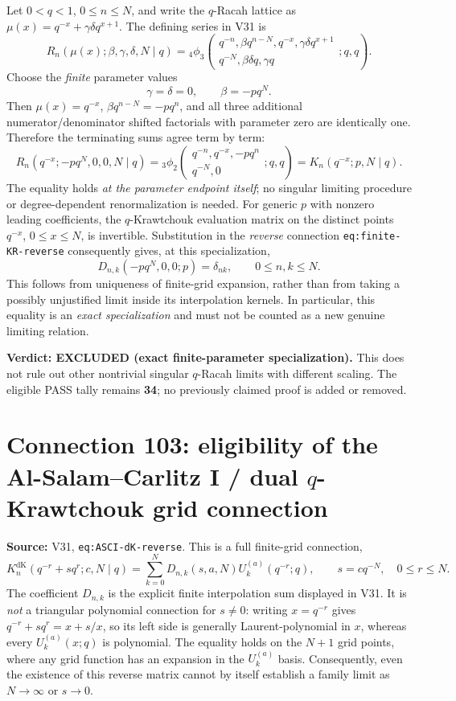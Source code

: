 \documentclass[11pt]{article}
\begin{document}
Let $0<q<1$, $0\le n\le N$, and write the $q$-Racah lattice as
$\mu(x)=q^{-x}+\gamma\delta q^{x+1}$. The defining series in V31 is
\[
R_n(\mu(x);\beta,\gamma,\delta,N\mid q)
={}_4\phi_3\!\left(\begin{matrix}
q^{-n},\beta q^{n-N},q^{-x},\gamma\delta q^{x+1}\\
q^{-N},\beta\delta q,\gamma q
\end{matrix};q,q\right).
\]
Choose the \emph{finite} parameter values
\[
\gamma=\delta=0,\qquad \beta=-pq^N.
\]
Then $\mu(x)=q^{-x}$, $\beta q^{n-N}=-pq^n$, and
all three additional numerator/denominator shifted factorials with
parameter zero are identically one. Therefore the terminating sums
agree term by term:
\[
\boxed{R_n(q^{-x};-pq^N,0,0,N\mid q)
={}_3\phi_2\!\left(\begin{matrix}
q^{-n},q^{-x},-pq^n\\q^{-N},0
\end{matrix};q,q\right)
=K_n(q^{-x};p,N\mid q).}
\]
The equality holds \emph{at the parameter endpoint itself}; no
singular limiting procedure or degree-dependent renormalization is
needed. For generic $p$ with nonzero leading coefficients, the
$q$-Krawtchouk evaluation matrix on the distinct points
$q^{-x}$, $0\le x\le N$, is invertible. Substitution in the
\emph{reverse} connection \texttt{eq:finite-KR-reverse} consequently
gives, at this specialization,
\[
D_{n,k}(-pq^N,0,0;p)=\delta_{nk},\qquad 0\le n,k\le N.
\]
This follows from uniqueness of finite-grid expansion, rather than
from taking a possibly unjustified limit inside its interpolation
kernels. In particular, this equality is an \emph{exact specialization}
and must not be counted as a new genuine limiting relation.

\noindent\textbf{Verdict: EXCLUDED (exact finite-parameter
specialization).} This does not rule out other nontrivial singular
$q$-Racah limits with different scaling. The eligible PASS tally
remains \textbf{34}; no previously claimed proof is added or removed.


\section{Connection 103: eligibility of the Al-Salam--Carlitz I / dual $q$-Krawtchouk grid connection}
\noindent\textbf{Source:} V31, \texttt{eq:ASCI-dK-reverse}. This is a full finite-grid connection,
\[
K_n^{\mathrm{dK}}(q^{-r}+sq^r;c,N\mid q)
=\sum_{k=0}^{N}D_{n,k}(s,a,N)U_k^{(a)}(q^{-r};q),
\qquad s=cq^{-N},\quad 0\le r\le N.
\]
The coefficient $D_{n,k}$ is the explicit finite interpolation sum displayed in V31.
It is \emph{not} a triangular polynomial connection for $s\ne0$: writing
$x=q^{-r}$ gives $q^{-r}+sq^r=x+s/x$, so its left side is generally
Laurent-polynomial in $x$, whereas every $U_k^{(a)}(x;q)$ is polynomial.
The equality holds on the $N+1$ grid points, where any grid function has
an expansion in the $U_k^{(a)}$ basis. Consequently, even the existence
of this reverse matrix cannot by itself establish a family limit as
$N\to\infty$ or $s\to0$.
\end{document}
